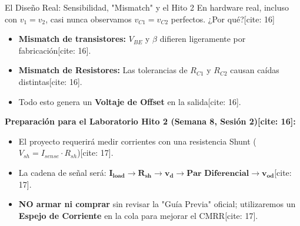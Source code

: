 \documentclass[aspectratio=169]{beamer}
\begin{document}
\begin{frame}{El Diseño Real: Sensibilidad, "Mismatch" y el Hito 2}
    En hardware real, incluso con $v_1 = v_2$, casi nunca observamos $v_{C1} = v_{C2}$ perfectos. ¿Por qué?[cite: 16]
    \begin{itemize}
        \item \textbf{Mismatch de transistores:} $V_{BE}$ y $\beta$ difieren ligeramente por fabricación[cite: 16].
        \item \textbf{Mismatch de Resistores:} Las tolerancias de $R_{C1}$ y $R_{C2}$ causan caídas distintas[cite: 16].
        \item Todo esto genera un \textbf{Voltaje de Offset} en la salida[cite: 16].
    \end{itemize}
    
    \vspace{0.2cm}
    \textbf{Preparación para el Laboratorio Hito 2 (Semana 8, Sesión 2)[cite: 16]:}
    \begin{itemize}
        \item El proyecto requerirá medir corrientes con una resistencia Shunt ($V_{sh} = I_{sense} \cdot R_{sh}$)[cite: 17].
        \item La cadena de señal será: $\mathbf{I_{load} \to R_{sh} \to v_d \to \text{Par Diferencial} \to v_{od}}$[cite: 17].
        \item \textbf{NO armar ni comprar} sin revisar la "Guía Previa" oficial; utilizaremos un \textbf{Espejo de Corriente} en la cola para mejorar el CMRR[cite: 17].
    \end{itemize}
\end{frame}
\end{document}
